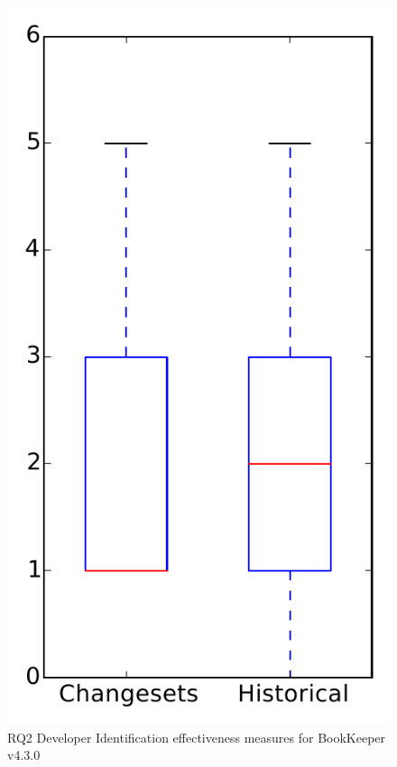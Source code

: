 
\begin{figure}
\centering
\includegraphics[height=0.4\textheight]{figures/dit/rq2_bookkeeper}
\caption{RQ2 Developer Identification effectiveness measures for BookKeeper v4.3.0}
\label{fig:dit:rq2:bookkeeper}
\end{figure}

